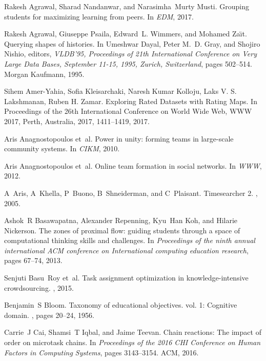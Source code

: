 \documentclass[11pt]{article}
\begin{document}
\begin{thebibliography}{10}
\begin{small}
Rakesh Agrawal, Sharad Nandanwar, and Narasimha~Murty Musti.
\newblock Grouping students for maximizing learning from peers.
\newblock In {\em EDM}, 2017.

Rakesh Agrawal, Giuseppe Psaila, Edward~L. Wimmers, and Mohamed Za{\"{\i}}t.
\newblock Querying shapes of histories.
\newblock In Umeshwar Dayal, Peter M.~D. Gray, and Shojiro Nishio, editors,
  {\em VLDB'95, Proceedings of 21th International Conference on Very Large Data
  Bases, September 11-15, 1995, Zurich, Switzerland}, pages 502--514. Morgan
  Kaufmann, 1995.

Sihem Amer-Yahia, Sofia Kleisarchaki, Naresh Kumar Kolloju, Laks V. S. Lakshmanan, Ruben H. Zamar.
\newblock Exploring Rated Datasets with Rating Maps.
\newblock In Proceedings of the 26th International Conference on World Wide Web, WWW 2017, Perth, Australia, 2017, 1411--1419, 2017.

Aris Anagnostopoulos et~al.
\newblock Power in unity: forming teams in large-scale community systems.
\newblock In {\em CIKM}, 2010.

Aris Anagnostopoulos et~al.
\newblock Online team formation in social networks.
\newblock In {\em WWW}, 2012.

A~Aris, A~Khella, P~Buono, B~Shneiderman, and C~Plaisant.
\newblock Timesearcher 2.
, 2005.

Ashok~R Basawapatna, Alexander Repenning, Kyu~Han Koh, and Hilarie Nickerson.
\newblock The zones of proximal flow: guiding students through a space of
  computational thinking skills and challenges.
\newblock In {\em Proceedings of the ninth annual international ACM conference
  on International computing education research}, pages 67--74, 2013.

Senjuti Basu~Roy et~al.
\newblock Task assignment optimization in knowledge-intensive crowdsourcing.
, 2015.

Benjamin~S Bloom.
\newblock Taxonomy of educational objectives. vol. 1: Cognitive domain.
, pages 20--24, 1956.

Carrie~J Cai, Shamsi~T Iqbal, and Jaime Teevan.
\newblock Chain reactions: The impact of order on microtask chains.
\newblock In {\em Proceedings of the 2016 CHI Conference on Human Factors in
  Computing Systems}, pages 3143--3154. ACM, 2016.


\end{small}
\end{thebibliography}
\end{document}
